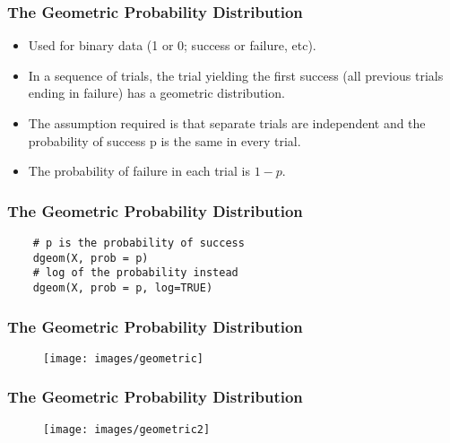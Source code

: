 \documentclass[MAIN.tex]{subfiles}
\begin{document}
 
\begin{frame}[fragile]
	\frametitle{The Geometric Probability Distribution}
	\large
	\begin{itemize}
\item	Used for binary data (1 or 0; success or failure, etc). 
\item In a sequence of trials, the trial yielding the first success (all previous trials ending in failure) has a geometric distribution. 
\item The assumption required is that separate trials are independent and the probability of success p is the same in every trial. 
\item The probability of failure in each trial is $1 - p$.
	\end{itemize}

\end{frame}
\begin{frame}[fragile]
	\frametitle{The Geometric Probability Distribution}
\begin{framed}
	\begin{verbatim}
	# p is the probability of success
	dgeom(X, prob = p)            
	# log of the probability instead
	dgeom(X, prob = p, log=TRUE)  
	\end{verbatim}
\end{framed}
\end{frame}
\begin{frame}[fragile]
	\frametitle{The Geometric Probability Distribution}
	
	\begin{figure}
		\centering
		\texttt{[image: images/geometric]}
		
	\end{figure}
	
\end{frame}
\begin{frame}[fragile]
	\frametitle{The Geometric Probability Distribution}
	
	\begin{figure}
		\centering
		\texttt{[image: images/geometric2]}
		
	\end{figure}
\end{frame}
\end{document}
